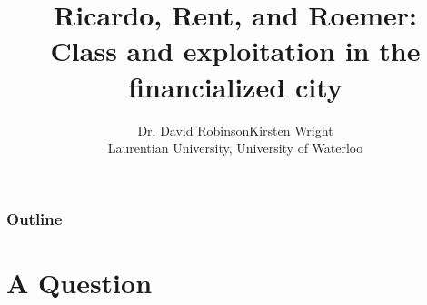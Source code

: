 \documentclass[notes]{beamer}
\begin{document}
  \title{Ricardo, Rent, and Roemer: \\Class and exploitation in the financialized city}


\author{Dr. David Robinson\hspace{30pt}Kirsten Wright\\
           Laurentian University, University of Waterloo}%
 
\def\defn#1{{\color{red} #1}}



%
\begin{frame}
\titlepage
\end{frame}

\begin{frame}\frametitle{Outline}
\tableofcontents
\end{frame}


\section{A Question}%
\end{document}
